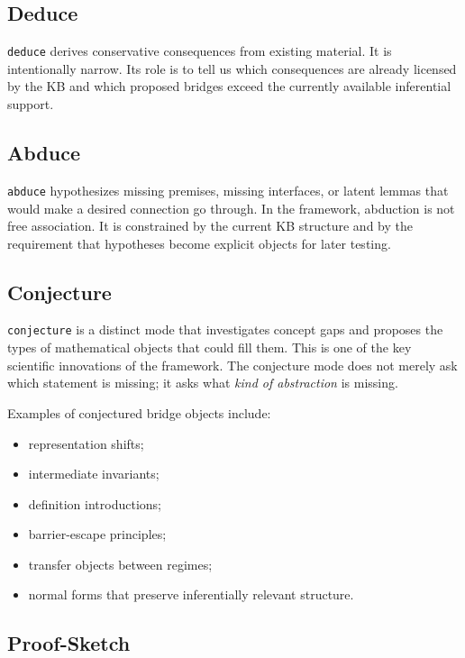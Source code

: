 \documentclass[11pt]{article}
\begin{document}
\subsection{Deduce}

\texttt{deduce} derives conservative consequences from existing material. It is intentionally narrow. Its role is to tell us which consequences are already licensed by the KB and which proposed bridges exceed the currently available inferential support.

\subsection{Abduce}

\texttt{abduce} hypothesizes missing premises, missing interfaces, or latent lemmas that would make a desired connection go through. In the framework, abduction is not free association. It is constrained by the current KB structure and by the requirement that hypotheses become explicit objects for later testing.

\subsection{Conjecture}

\texttt{conjecture} is a distinct mode that investigates concept gaps and proposes the types of mathematical objects that could fill them. This is one of the key scientific innovations of the framework. The conjecture mode does not merely ask which statement is missing; it asks what \emph{kind of abstraction} is missing.

Examples of conjectured bridge objects include:

\begin{itemize}[leftmargin=*,itemsep=0.2em]
\item representation shifts;
\item intermediate invariants;
\item definition introductions;
\item barrier-escape principles;
\item transfer objects between regimes;
\item normal forms that preserve inferentially relevant structure.
\end{itemize}

\subsection{Proof-Sketch}
\end{document}
